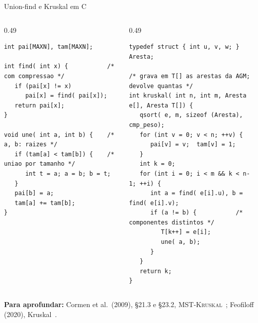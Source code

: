 \documentclass[aspectratio=169,xcolor=table]{beamer}
\newcommand{\fonte}[1]{%
  \vfill
  {\tiny\color{gray!55!black}\textbf{Para aprofundar:} #1\par}%
}
\begin{document}
\begin{frame}[fragile]{Union-find e Kruskal em C}
  \begin{columns}[T]
    \begin{column}{0.49\textwidth}
\begin{lstlisting}[basicstyle=\ttfamily\tiny]
int pai[MAXN], tam[MAXN];

int find( int x) {           /* com compressao */
   if (pai[x] != x)
      pai[x] = find( pai[x]);
   return pai[x];
}

void une( int a, int b) {    /* a, b: raizes */
   if (tam[a] < tam[b]) {    /* uniao por tamanho */
      int t = a; a = b; b = t;
   }
   pai[b] = a;
   tam[a] += tam[b];
}
\end{lstlisting}
    \end{column}
    \begin{column}{0.49\textwidth}
\begin{lstlisting}[basicstyle=\ttfamily\tiny]
typedef struct { int u, v, w; } Aresta;

/* grava em T[] as arestas da AGM; devolve quantas */
int kruskal( int n, int m, Aresta e[], Aresta T[]) {
   qsort( e, m, sizeof (Aresta), cmp_peso);
   for (int v = 0; v < n; ++v) {
      pai[v] = v;  tam[v] = 1;
   }
   int k = 0;
   for (int i = 0; i < m && k < n-1; ++i) {
      int a = find( e[i].u), b = find( e[i].v);
      if (a != b) {           /* componentes distintos */
         T[k++] = e[i];
         une( a, b);
      }
   }
   return k;
}
\end{lstlisting}
    \end{column}
  \end{columns}
  \fonte{Cormen et al.\ (2009), \S 21.3 e \S 23.2, \textsc{MST-Kruskal}~\cite{cormen2009introduction};
    Feofiloff (2020), Kruskal~\cite{feofiloff2020grafos}.}
\end{frame}
\end{document}

